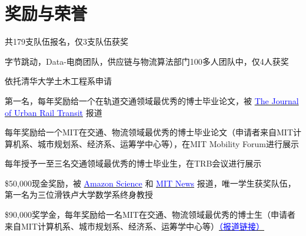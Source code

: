 
\section{奖励与荣誉}

共179支队伍报名，仅3支队伍获奖
\vspace{5pt}

字节跳动，Data-电商团队，供应链与物流算法部门100多人团队中，仅4人获奖
\vspace{5pt}

依托清华大学土木工程系申请
\vspace{5pt}


第一名，每年奖励给一个在轨道交通领域最优秀的博士毕业论文，被 {\href{https://link.springer.com/journal/40864/updates/27693480#:~:text=The%20Journal%20of%20Urban%20Rail,field%20of%20Urban%20Rail%20Transit.}{\textcolor{blue}{{ The Journal of Urban Rail Transit}}}} 报道
\vspace{5pt}


每年奖励给一个MIT在交通、物流领域最优秀的博士毕业论文（申请者来自MIT计算机系、城市规划系、经济系、运筹学中心等），在MIT Mobility Forum进行展示
\vspace{5pt}

每年授予一至三名交通领域最优秀的博士毕业生，在TRB会议进行展示
\vspace{5pt}

\$50,000现金奖励，被 {\href{https://www.amazon.science/academic-engagements/winning-last-mile-challenge-team-addresses-problem-of-combining-mathematical-routes-with-driver-knowledge}{\textcolor{blue}{{Amazon Science}}}} 和   {\href{https://news.mit.edu/2021/last-mile-routing-research-challenge-three-winning-teams-0824}{\textcolor{blue}{{MIT News}}}} 报道，唯一学生获奖队伍，第一名为三位滑铁卢大学数学系终身教授
\vspace{5pt}

\$90,000奖学金，每年奖励给一名MIT在交通、物流领域最优秀的博士生（申请者来自MIT计算机系、城市规划系、经济系、运筹学中心等）{\href{https://ctl.mit.edu/news/ups-fellowships-maintain-tradition-graduate-student-support}{\textcolor{blue}{{（报道链接）}}}} 
\vspace{5pt}

